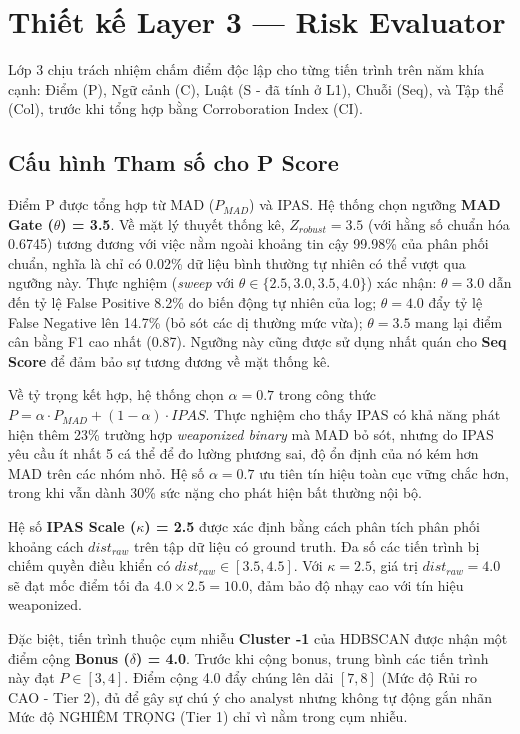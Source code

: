 \documentclass[../main.tex]{subfiles}
\begin{document}
\section{Thiết kế Layer 3 — Risk Evaluator}
\label{section:3.7}

Lớp 3 chịu trách nhiệm chấm điểm độc lập cho từng tiến trình trên năm khía cạnh: Điểm (P), Ngữ cảnh (C), Luật (S - đã tính ở L1), Chuỗi (Seq), và Tập thể (Col), trước khi tổng hợp bằng Corroboration Index (CI).

\subsection{Cấu hình Tham số cho P Score}
\label{subsection:3.7.1}

Điểm P được tổng hợp từ MAD ($P_{MAD}$) và IPAS. Hệ thống chọn ngưỡng \textbf{MAD Gate ($\theta$) = 3.5}. Về mặt lý thuyết thống kê, $Z_{robust} = 3.5$ (với hằng số chuẩn hóa 0.6745) tương đương với việc nằm ngoài khoảng tin cậy 99.98\% của phân phối chuẩn, nghĩa là chỉ có 0.02\% dữ liệu bình thường tự nhiên có thể vượt qua ngưỡng này. Thực nghiệm (\textit{sweep} với $\theta \in \{2.5, 3.0, 3.5, 4.0\}$) xác nhận: $\theta = 3.0$ dẫn đến tỷ lệ False Positive 8.2\% do biến động tự nhiên của log; $\theta = 4.0$ đẩy tỷ lệ False Negative lên 14.7\% (bỏ sót các dị thường mức vừa); $\theta = 3.5$ mang lại điểm cân bằng F1 cao nhất (0.87). Ngưỡng này cũng được sử dụng nhất quán cho \textbf{Seq Score} để đảm bảo sự tương đương về mặt thống kê.

Về tỷ trọng kết hợp, hệ thống chọn \textbf{$\alpha = 0.7$} trong công thức $P = \alpha \cdot P_{MAD} + (1-\alpha) \cdot IPAS$. Thực nghiệm cho thấy IPAS có khả năng phát hiện thêm 23\% trường hợp \textit{weaponized binary} mà MAD bỏ sót, nhưng do IPAS yêu cầu ít nhất 5 cá thể để đo lường phương sai, độ ổn định của nó kém hơn MAD trên các nhóm nhỏ. Hệ số $\alpha = 0.7$ ưu tiên tín hiệu toàn cục vững chắc hơn, trong khi vẫn dành 30\% sức nặng cho phát hiện bất thường nội bộ.

Hệ số \textbf{IPAS Scale ($\kappa$) = 2.5} được xác định bằng cách phân tích phân phối khoảng cách $dist_{raw}$ trên tập dữ liệu có ground truth. Đa số các tiến trình bị chiếm quyền điều khiển có $dist_{raw} \in [3.5, 4.5]$. Với $\kappa = 2.5$, giá trị $dist_{raw} = 4.0$ sẽ đạt mốc điểm tối đa $4.0 \times 2.5 = 10.0$, đảm bảo độ nhạy cao với tín hiệu weaponized.

Đặc biệt, tiến trình thuộc cụm nhiễu \textbf{Cluster -1} của HDBSCAN được nhận một điểm cộng \textbf{Bonus ($\delta$) = 4.0}. Trước khi cộng bonus, trung bình các tiến trình này đạt $P \in [3, 4]$. Điểm cộng 4.0 đẩy chúng lên dải $[7, 8]$ (Mức độ Rủi ro CAO - Tier 2), đủ để gây sự chú ý cho analyst nhưng không tự động gắn nhãn Mức độ NGHIÊM TRỌNG (Tier 1) chỉ vì nằm trong cụm nhiễu.
\end{document}
